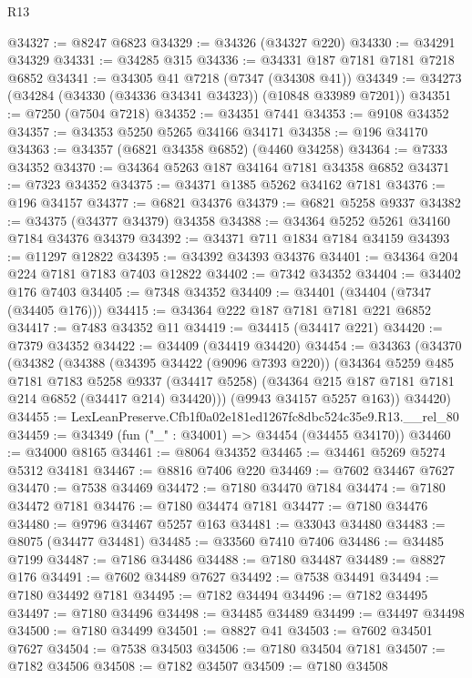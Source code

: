 \begin{lexlean}{R13}
\begin{coremodule}
@34327 := @8247 @6823
@34329 := @34326 (@34327 @220)
@34330 := @34291 @34329
@34331 := @34285 @315
@34336 := @34331 @187 @7181 @7181 @7218 @6852
@34341 := @34305 @41 @7218 (@7347 (@34308 @41))
@34349 := @34273 (@34284 (@34330 (@34336 @34341 @34323)) (@10848 @33989 @7201))
@34351 := @7250 (@7504 @7218)
@34352 := @34351 @7441
@34353 := @9108 @34352
@34357 := @34353 @5250 @5265 @34166 @34171
@34358 := @196 @34170
@34363 := @34357 (@6821 @34358 @6852) (@4460 @34258)
@34364 := @7333 @34352
@34370 := @34364 @5263 @187 @34164 @7181 @34358 @6852
@34371 := @7323 @34352
@34375 := @34371 @1385 @5262 @34162 @7181
@34376 := @196 @34157
@34377 := @6821 @34376
@34379 := @6821 @5258 @9337
@34382 := @34375 (@34377 @34379) @34358
@34388 := @34364 @5252 @5261 @34160 @7184 @34376 @34379
@34392 := @34371 @711 @1834 @7184 @34159
@34393 := @11297 @12822
@34395 := @34392 @34393 @34376
@34401 := @34364 @204 @224 @7181 @7183 @7403 @12822
@34402 := @7342 @34352
@34404 := @34402 @176 @7403
@34405 := @7348 @34352
@34409 := @34401 (@34404 (@7347 (@34405 @176)))
@34415 := @34364 @222 @187 @7181 @7181 @221 @6852
@34417 := @7483 @34352 @11
@34419 := @34415 (@34417 @221)
@34420 := @7379 @34352
@34422 := @34409 (@34419 @34420)
@34454 := @34363
    (@34370
      (@34382
        (@34388
          (@34395 @34422 (@9096 @7393 @220))
          (@34364
            @5259
            @485
            @7181
            @7183
            @5258
            @9337
            (@34417 @5258)
            (@34364 @215 @187 @7181 @7181 @214 @6852 (@34417 @214) @34420)))
        (@9943 @34157 @5257 @163))
      @34420)
@34455 := LexLeanPreserve.Cfb1f0a02e181ed1267fc8dbc524c35e9.R13.__rel_80
@34459 := @34349 (fun ("_" : @34001) => @34454 (@34455 @34170))
@34460 := @34000 @8165
@34461 := @8064 @34352
@34465 := @34461 @5269 @5274 @5312 @34181
@34467 := @8816 @7406 @220
@34469 := @7602 @34467 @7627
@34470 := @7538 @34469
@34472 := @7180 @34470 @7184
@34474 := @7180 @34472 @7181
@34476 := @7180 @34474 @7181
@34477 := @7180 @34476
@34480 := @9796 @34467 @5257 @163
@34481 := @33043 @34480
@34483 := @8075 (@34477 @34481)
@34485 := @33560 @7410 @7406
@34486 := @34485 @7199
@34487 := @7186 @34486
@34488 := @7180 @34487
@34489 := @8827 @176
@34491 := @7602 @34489 @7627
@34492 := @7538 @34491
@34494 := @7180 @34492 @7181
@34495 := @7182 @34494
@34496 := @7182 @34495
@34497 := @7180 @34496
@34498 := @34485 @34489
@34499 := @34497 @34498
@34500 := @7180 @34499
@34501 := @8827 @41
@34503 := @7602 @34501 @7627
@34504 := @7538 @34503
@34506 := @7180 @34504 @7181
@34507 := @7182 @34506
@34508 := @7182 @34507
@34509 := @7180 @34508

\end{coremodule}
\end{lexlean}
